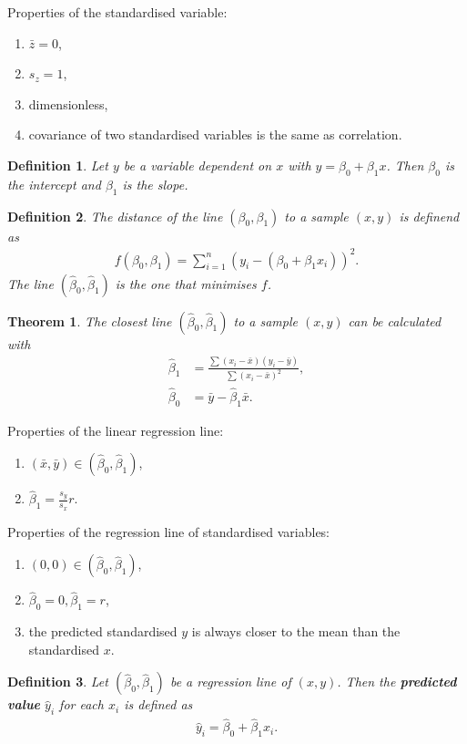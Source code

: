 \documentclass{article}
\theoremstyle{sltheorem}
\newtheorem{definition}{Definition}[section]
\newtheorem{theorem}{Theorem}[section]
\newcommand*\B[1]{\textbf{#1}}
\begin{document}
Properties of the standardised variable:
\begin{enumerate}
	\item $\bar z = 0$,
	\item $s_z = 1$,
	\item dimensionless,
	\item covariance of two standardised variables is the same as correlation.
\end{enumerate}
\begin{definition}
	Let $y$ be a variable dependent on $x$ with $y=\beta_0 + \beta_1 x$. Then
	$\beta_0$ is the intercept and $\beta_1$ is the slope.
\end{definition}
\begin{definition}
	The distance of the line $(\beta_0,\beta_1)$ to a sample $(x,y)$ is definend as
	\begin{align*}
		f(\beta_0, \beta_1) = \sum_{i=1}^n (y_i -(\beta_0 + \beta_1 x_i))^2.
	\end{align*}
	The line $(\hat\beta_0, \hat\beta_1)$ is the one that minimises $f$.
\end{definition}
\begin{theorem}
	The closest line $(\hat\beta_0,\hat\beta_1)$ to a sample $(x,y)$ can be calculated with
	\begin{align*}
		\hat\beta_1&=\frac{\sum(x_i-\bar x)(y_i-\bar y)}{\sum(x_i-\bar x)^2},\\
		\hat\beta_0&=\bar y - \hat\beta_1\bar x.
	\end{align*}
\end{theorem}
Properties of the linear regression line:
\begin{enumerate}
	\item $(\bar x, \bar y)\in(\hat\beta_0, \hat\beta_1)$,
	\item $\hat\beta_1 = \frac{s_y}{s_x}r$.
\end{enumerate}
Properties of the regression line of standardised variables:
\begin{enumerate}
	\item $(0,0)\in(\hat\beta_0,\hat\beta_1)$,
	\item $\hat\beta_0=0,\hat\beta_1=r$,
	\item the predicted standardised $y$ is always closer to the mean than the standardised $x$.
\end{enumerate}
\begin{definition}
	Let $(\hat\beta_0,\hat\beta_1)$ be a regression line of $(x,y)$. Then the
	\B{predicted value} $\hat y_i$ for each $x_i$ is defined as
	\begin{align*}
		\hat y_i = \hat\beta_0 + \hat\beta_1 x_i.
	\end{align*}
\end{definition}
\end{document}

